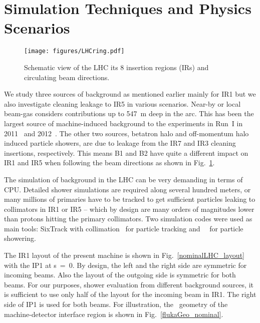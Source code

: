 \section{Simulation Techniques and Physics Scenarios\label{simSetup}}


\begin{figure}%
\begin{center}
\texttt{[image: figures/LHCring.pdf]}
\end{center}
\vspace{-0.6cm}
 \caption{Schematic view of the LHC its 8 insertion regions (IRs) and circulating beam directions.
  \label{LHCring}}
\end{figure}

We study three sources of background as mentioned earlier mainly for IR1 but we also investigate cleaning leakage to IR5 in various scenarios. Near-by or local beam-gas considers contributions up to 547~m deep in the arc. This has been the largest source of machine-induced background to the experiments in Run~I in 2011~\cite{nimPaperRod} and 2012~\cite{atlasBKGPaper2012}. The other two sources, betatron halo and off-momentum halo induced particle showers, are due to leakage from the IR7 and IR3 cleaning insertions, respectively. This means B1 and B2 have quite a different impact on IR1 and IR5 when following the beam directions as shown in Fig.~\ref{LHCring}.

The simulation of background in the LHC can be very demanding in terms of CPU. Detailed shower simulations are required along several hundred meters, or many millions of primaries have to be tracked to get sufficient particles leaking to collimators in IR1 or IR5 -- which by design are many orders of magnitudes lower than protons hitting the primary collimators. Two simulation codes were used as main tools: SixTrack with collimation~\cite{SixTrackRef} for particle tracking and \fluka~\cite{flukaRef1,flukaRef2}~for particle showering.

The IR1 layout of the present machine is shown in Fig.~\ref{nominalLHC_layout} with the IP1 at s~=~0. By design, the left and the right side are symmetric for incoming beams. Also the layout of the outgoing side is symmetric for both beams. For our purposes, shower evaluation from different background sources, it is sufficient to use only half of the layout for the incoming beam in IR1. The right side of IP1 is used for both beams. For illustration, the \fluka~geometry of the machine-detector interface region is shown in Fig.~\ref{flukaGeo_nominal}.



